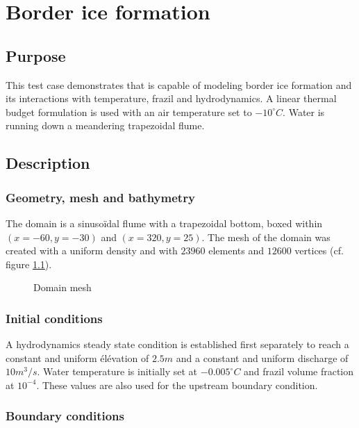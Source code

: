 \renewcommand{\labelitemi}{$\triangleright$}

\chapter{Border ice formation}

\section{Purpose}
This test case demonstrates that \khione is capable of modeling border ice formation and its interactions with
temperature, frazil and hydrodynamics.
A linear thermal budget formulation is used with an air temperature set to $-10^{\circ} C$. Water is running down a meandering trapezoidal flume. 

\section{Description}

\subsection{Geometry, mesh and bathymetry}
The domain is a sinusoïdal flume with a trapezoidal bottom, boxed within $(x=-60, y=-30)$ and $(x=320, y=25)$.
The mesh of the domain was created with a uniform density and with $23960$ elements and $12600$ vertices (cf. figure \ref{fig:mesh}).

\begin{figure}[H]
    \begin{center}
    \end{center}
    \caption{Domain mesh}
    \label{fig:mesh}
\end{figure}

\subsection{Initial conditions}

A hydrodynamics steady state condition is established first separately to reach a constant and uniform élévation of $2.5m$ and a constant and uniform discharge of $10m^3/s$.
Water temperature is initially set at $-0.005^\circ C$ and frazil volume fraction at $10^{-4}$. These values are also used for the upstream boundary condition.

\subsection{Boundary conditions}


